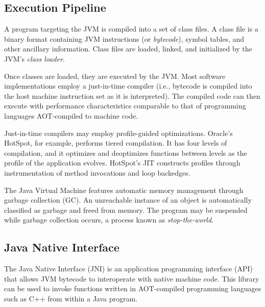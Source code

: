 
\subsection{Execution Pipeline}

A program targeting the JVM is compiled into a set of class files. A class file is a binary format containing JVM instructions (or \emph{bytecode}), symbol tables, and other ancillary information. Class files are loaded, linked, and initialized by the JVM's \emph{class loader}.

Once classes are loaded, they are executed by the JVM. Most software implementations employ a just-in-time compiler (i.e., bytecode is compiled into the host machine instruction set as it is interpreted). The compiled code can then execute with performance characteristics comparable to that of programming languages AOT-compiled to machine code.

Just-in-time compilers may employ profile-guided optimizations. Oracle's HotSpot, for example, performs tiered compilation. It has four levels of compilation, and it optimizes and deoptimizes functions between levels as the profile of the application evolves. HotSpot's JIT constructs profiles through instrumentation of method invocations and loop backedges.

The Java Virtual Machine features automatic memory management through garbage collection (GC). An unreachable instance of an object is automatically classified as garbage and freed from memory. The program may be suspended while garbage collection occurs, a process known as \emph{stop-the-world}.



\subsection{Java Native Interface}

The Java Native Interface (JNI) is an application programming interface (API) that allows JVM bytecode to interoperate with native machine code. This library can be used to invoke functions written in AOT-compiled programming languages such as C++ from within a Java program.

